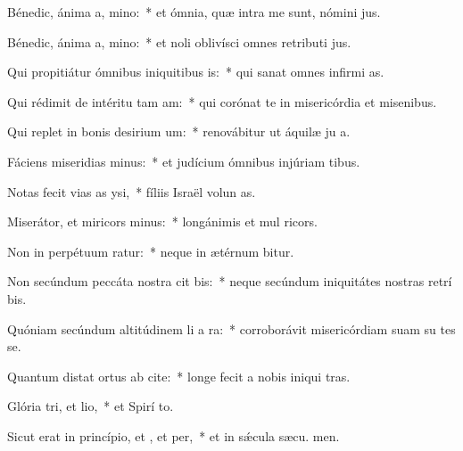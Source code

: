 \item Bénedic, ánima a, mino:~* et ómnia, quæ intra me sunt, nómini  jus.
\item Bénedic, ánima a, mino:~* et noli oblivísci omnes retributi jus.
\item Qui propitiátur ómnibus iniquitibus is:~* qui sanat omnes infirmi as.
\item Qui rédimit de intéritu tam am:~* qui corónat te in misericórdia et misenibus.
\item Qui replet in bonis desirium um:~* renovábitur ut áquilæ ju a.
\item Fáciens miseridias minus:~* et judícium ómnibus injúriam tibus.
\item Notas fecit vias as ysi,~* fíliis Israël volun as.
\item Miserátor, et miricors minus:~* longánimis et mul ricors.
\item Non in perpétuum ratur:~* neque in ætérnum bitur.
\item Non secúndum peccáta nostra cit bis:~* neque secúndum iniquitátes nostras retrí bis.
\item Quóniam secúndum altitúdinem li a ra:~* corroborávit misericórdiam suam su tes se.
\item Quantum distat ortus ab cite:~* longe fecit a nobis iniqui tras.
\item Glória tri, et lio,~* et Spirí to.
\item Sicut erat in princípio, et , et per,~* et in sǽcula sæcu. men.
